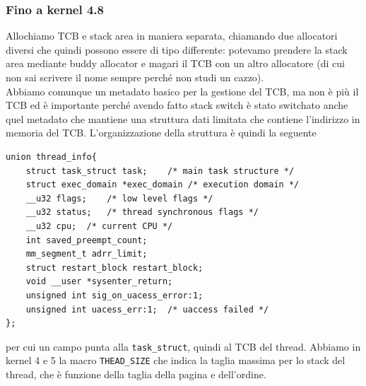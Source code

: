 \documentclass[12pt, oneside]{extbook}
\begin{document}
\subsubsection{Fino a kernel 4.8}
Allochiamo TCB e stack area in maniera separata, chiamando due allocatori diversi che quindi possono essere di tipo differente: potevamo prendere la stack area mediante buddy allocator e magari il TCB con un altro allocatore (di cui non sai scrivere il nome sempre perché non studi un cazzo).\\Abbiamo comunque un metadato basico per la gestione del TCB, ma non è più il TCB ed è importante perché avendo fatto stack switch è stato switchato anche quel metadato che mantiene una struttura dati limitata che contiene l'indirizzo in memoria del TCB. L'organizzazione della struttura è quindi la seguente
\begin{lstlisting}
union thread_info{
	struct task_struct task;	/* main task structure */
	struct exec_domain *exec_domain	/* execution domain */
	__u32 flags;	/* low level flags */
	__u32 status;	/* thread synchronous flags */
	__u32 cpu;	/* current CPU */
	int saved_preempt_count;
	mm_segment_t adrr_limit;
	struct restart_block restart_block;
	void __user *sysenter_return;
	unsigned int sig_on_uacess_error:1;
	unsigned int uacess_err:1;	/* uaccess failed */
};
\end{lstlisting}
per cui un campo punta alla \texttt{task\_struct}, quindi al TCB del thread.
Abbiamo in kernel 4 e 5 la macro \texttt{THEAD\_SIZE} che indica la taglia massima per lo stack del thread, che è funzione della taglia della pagina e dell'ordine.
\end{document}

